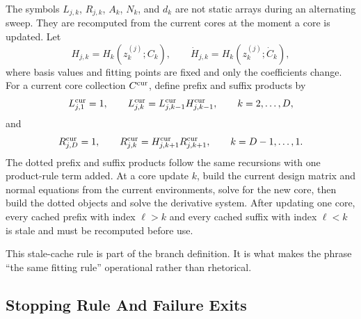 The symbols \(L_{j,k}\), \(R_{j,k}\), \(A_k\), \(N_k\), and \(d_k\) are not
static arrays during an alternating sweep.  They are recomputed from the current
cores at the moment a core is updated.  Let
\begin{equation}
  H_{j,k}=H_k(z_k^{(j)};C_k),
  \qquad
  \dot H_{j,k}=H_k(z_k^{(j)};\dot C_k),
  \label{eq:bf-hd-squared-tt-sweep-H}
\end{equation}
where basis values and fitting points are fixed and only the coefficients change.
For a current core collection \(C^{\rm cur}\), define prefix and suffix products
by
\begin{equation}
  L_{j,1}^{\rm cur}=1,
  \qquad
  L_{j,k}^{\rm cur}=L_{j,k-1}^{\rm cur}H_{j,k-1}^{\rm cur},
  \qquad k=2,\ldots,D,
  \label{eq:bf-hd-squared-tt-sweep-prefix}
\end{equation}
and
\begin{equation}
  R_{j,D}^{\rm cur}=1,
  \qquad
  R_{j,k}^{\rm cur}=H_{j,k+1}^{\rm cur}R_{j,k+1}^{\rm cur},
  \qquad k=D-1,\ldots,1.
  \label{eq:bf-hd-squared-tt-sweep-suffix}
\end{equation}
The dotted prefix and suffix products follow the same recursions with one
product-rule term added.  At a core update \(k\), build the current design
matrix and normal equations from the current environments, solve for the new
core, then build the dotted objects and solve the derivative system.  After
updating one core, every cached prefix with index \(\ell>k\) and every cached
suffix with index \(\ell<k\) is stale and must be recomputed before use.

This stale-cache rule is part of the branch definition.  It is what makes the
phrase “the same fitting rule” operational rather than rhetorical.

\subsection{Stopping Rule And Failure Exits}
\label{sec:bf-hd-squared-tt-stopping-failures}

